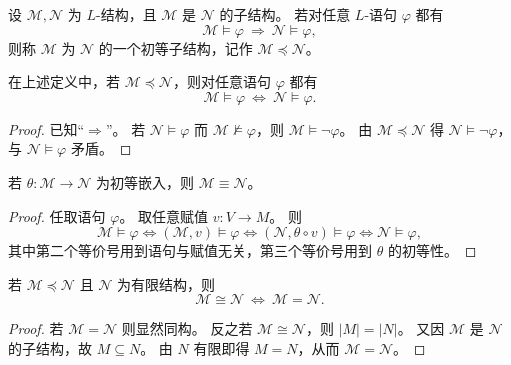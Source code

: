 \documentclass[lang=cn,a4paper,newtx,section]{elegantbook}
\begin{document}
 \begin{definition}[初等子结构]
 \label{elementary-substructure}
 设 $\mathcal M,\mathcal N$ 为 $L$-结构，且 $\mathcal M$ 是 $\mathcal N$ 的子结构。
 若对任意 $L$-语句 $\varphi$ 都有
 \[
   \mathcal M\models\varphi\ \Longrightarrow\ \mathcal N\models\varphi,
 \]
 则称 $\mathcal M$ 为 $\mathcal N$ 的一个初等子结构，记作 $\mathcal M\preccurlyeq\mathcal N$。
 \end{definition}

 \begin{remark}
 在上述定义中，若 $\mathcal M\preccurlyeq\mathcal N$，则对任意语句 $\varphi$ 都有
 \[
   \mathcal M\models\varphi\ \Longleftrightarrow\ \mathcal N\models\varphi.
 \]
 \end{remark}

 \begin{proof}
 已知“$\Rightarrow$”。
 若 $\mathcal N\models\varphi$ 而 $\mathcal M\not\models\varphi$，则 $\mathcal M\models\neg\varphi$。
 由 $\mathcal M\preccurlyeq\mathcal N$ 得 $\mathcal N\models\neg\varphi$，与 $\mathcal N\models\varphi$ 矛盾。
 \end{proof}

 \begin{proposition}
 \label{elementary-embedding-implies-equivalence}
 若 $\theta:\mathcal M\to\mathcal N$ 为初等嵌入，则 $\mathcal M\equiv\mathcal N$。
 \end{proposition}

 \begin{proof}
 任取语句 $\varphi$。
 取任意赋值 $v:V\to M$。
 则
 \[
   \mathcal M\models\varphi
   \Longleftrightarrow
   (\mathcal M,v)\models\varphi
   \Longleftrightarrow
   (\mathcal N,\theta\circ v)\models\varphi
   \Longleftrightarrow
   \mathcal N\models\varphi,
 \]
 其中第二个等价号用到语句与赋值无关，第三个等价号用到 $\theta$ 的初等性。
 \end{proof}

 \begin{theorem}
 \label{finite-elementary-substructure}
 若 $\mathcal M\preccurlyeq\mathcal N$ 且 $\mathcal N$ 为有限结构，则
 \[
   \mathcal M\cong\mathcal N\ \Longleftrightarrow\ \mathcal M=\mathcal N.
 \]
 \end{theorem}

 \begin{proof}
 若 $\mathcal M=\mathcal N$ 则显然同构。
 反之若 $\mathcal M\cong\mathcal N$，则 $|M|=|N|$。
 又因 $\mathcal M$ 是 $\mathcal N$ 的子结构，故 $M\subseteq N$。
 由 $N$ 有限即得 $M=N$，从而 $\mathcal M=\mathcal N$。
 \end{proof}
\end{document}
